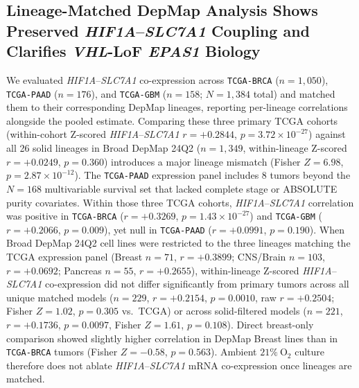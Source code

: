 \documentclass[11pt]{article}
\begin{document}
\subsection{Lineage-Matched DepMap Analysis Shows Preserved \textit{HIF1A}--\textit{SLC7A1} Coupling and Clarifies \textit{VHL}-LoF \textit{EPAS1} Biology}
We evaluated \textit{HIF1A}--\textit{SLC7A1} co-expression across \texttt{TCGA-BRCA} ($n = 1,050$), \texttt{TCGA-PAAD} ($n = 176$), and \texttt{TCGA-GBM} ($n = 158$; $N = 1,384$ total) and matched them to their corresponding DepMap lineages, reporting per-lineage correlations alongside the pooled estimate. Comparing these three primary TCGA cohorts (within-cohort Z-scored \textit{HIF1A}--\textit{SLC7A1} $r = +0.2844$, $p = 3.72 \times 10^{-27}$) against all 26 solid lineages in Broad DepMap 24Q2 ($n = 1,349$, within-lineage Z-scored $r = +0.0249$, $p = 0.360$) introduces a major lineage mismatch (Fisher $Z = 6.98$, $p = 2.87 \times 10^{-12}$). The \texttt{TCGA-PAAD} expression panel includes 8 tumors beyond the $N = 168$ multivariable survival set that lacked complete stage or ABSOLUTE purity covariates. Within those three TCGA cohorts, \textit{HIF1A}--\textit{SLC7A1} correlation was positive in \texttt{TCGA-BRCA} ($r = +0.3269$, $p = 1.43 \times 10^{-27}$) and \texttt{TCGA-GBM} ($r = +0.2066$, $p = 0.009$), yet null in \texttt{TCGA-PAAD} ($r = +0.0991$, $p = 0.190$). When Broad DepMap 24Q2 cell lines were restricted to the three lineages matching the TCGA expression panel (Breast $n = 71$, $r = +0.3899$; CNS/Brain $n = 103$, $r = +0.0692$; Pancreas $n = 55$, $r = +0.2655$), within-lineage Z-scored \textit{HIF1A}--\textit{SLC7A1} co-expression did not differ significantly from primary tumors across all unique matched models ($n = 229$, $r = +0.2154$, $p = 0.0010$, raw $r = +0.2504$; Fisher $Z = 1.02$, $p = 0.305$ vs.\ TCGA) or across solid-filtered models ($n = 221$, $r = +0.1736$, $p = 0.0097$, Fisher $Z = 1.61$, $p = 0.108$). Direct breast-only comparison showed slightly higher correlation in DepMap Breast lines than in \texttt{TCGA-BRCA} tumors (Fisher $Z = -0.58$, $p = 0.563$). Ambient $21\%\ \text{O}_2$ culture therefore does not ablate \textit{HIF1A}--\textit{SLC7A1} mRNA co-expression once lineages are matched.
\end{document}
